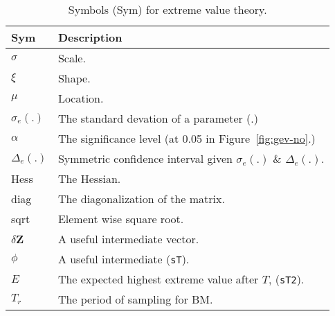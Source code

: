 \begin{table}[h!]
    \centering
    \begin{tabular}{ll}
    \hline \hline
    \textbf{Sym} & \textbf{Description} \\
    \hline
        $\sigma$ & Scale. \\
        $\xi$ & Shape. \\
        $\mu$ & Location. \\
        $\sigma_e(.)$ & The standard devation of a parameter (.)\\
        $\alpha$ & The significance level (at 0.05 in Figure~\ref{fig:gev-no}.)\\
        $\Delta_e(.)$ & Symmetric confidence interval given $\sigma_e(.)$ \& $\Delta_e(.)$. \\
        Hess & The Hessian.\\
        diag & The diagonalization of the matrix. \\
        sqrt & Element wise square root.\\
        $\delta \mathbf{Z}$ & A useful intermediate vector. \\
        $\phi$ & A useful intermediate (\texttt{sT}). \\
        $E$ & The expected highest extreme value after $T$, (\texttt{sT2}).\\
        $T_r$ & The period of sampling for BM. \\
    \hline \hline
    \end{tabular}
    \caption{Symbols (Sym) for extreme value theory.}
    \label{tab:fluid_variables}
\end{table}
